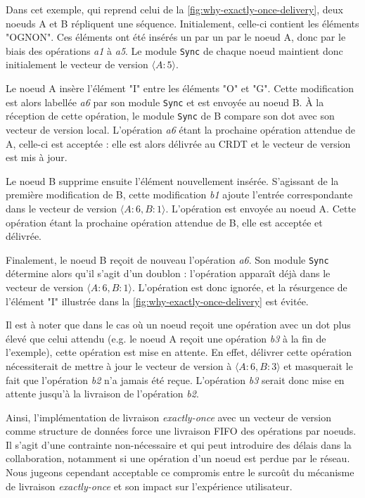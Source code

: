 \documentclass[12pt]{thesul}
\newcommand{\eg}{e.g. }
\begin{document}
Dans cet exemple, qui reprend celui de la \autoref{fig:why-exactly-once-delivery}, deux noeuds A et B répliquent une séquence.
Initialement, celle-ci contient les éléments "OGNON".
Ces éléments ont été insérés un par un par le noeud A, donc par le biais des opérations \emph{a1} à \emph{a5}.
Le module \texttt{Sync} de chaque noeud maintient donc initialement le vecteur de version $\langle A:5 \rangle$.

Le noeud A insère l'élément "I" entre les éléments "O" et "G".
Cette modification est alors labellée \emph{a6} par son module \texttt{Sync} et est envoyée au noeud B.
À la réception de cette opération, le module \texttt{Sync} de B compare son dot avec son vecteur de version local.
L'opération \emph{a6} étant la prochaine opération attendue de A, celle-ci est acceptée : elle est alors délivrée au \ac{CRDT} et le vecteur de version est mis à jour.

Le noeud B supprime ensuite l'élément nouvellement insérée.
S'agissant de la première modification de B, cette modification \emph{b1} ajoute l'entrée correspondante dans le vecteur de version $\langle A:6, B:1 \rangle$.
L'opération est envoyée au noeud A.
Cette opération étant la prochaine opération attendue de B, elle est acceptée et délivrée.

Finalement, le noeud B reçoit de nouveau l'opération \emph{a6}.
Son module \texttt{Sync} détermine alors qu'il s'agit d'un doublon : l'opération apparaît déjà dans le vecteur de version $\langle A:6, B:1 \rangle$.
L'opération est donc ignorée, et la résurgence de l'élément "I" illustrée dans la \autoref{fig:why-exactly-once-delivery} est évitée.

Il est à noter que dans le cas où un noeud reçoit une opération avec un dot plus élevé que celui attendu (\eg le noeud A reçoit une opération \emph{b3} à la fin de l'exemple), cette opération est mise en attente.
En effet, délivrer cette opération nécessiterait de mettre à jour le vecteur de version à $\langle A:6,B:3 \rangle$ et masquerait le fait que l'opération \emph{b2} n'a jamais été reçue.
L'opération \emph{b3} serait donc mise en attente jusqu'à la livraison de l'opération \emph{b2}.

Ainsi, l'implémentation de livraison \emph{exactly-once} avec un vecteur de version comme structure de données force une livraison \ac{FIFO} des opérations par noeuds.
Il s'agit d'une contrainte non-nécessaire et qui peut introduire des délais dans la collaboration, notamment si une opération d'un noeud est perdue par le réseau.
Nous jugeons cependant acceptable ce compromis entre le surcoût du mécanisme de livraison \emph{exactly-once} et son impact sur l'expérience utilisateur.
\end{document}

